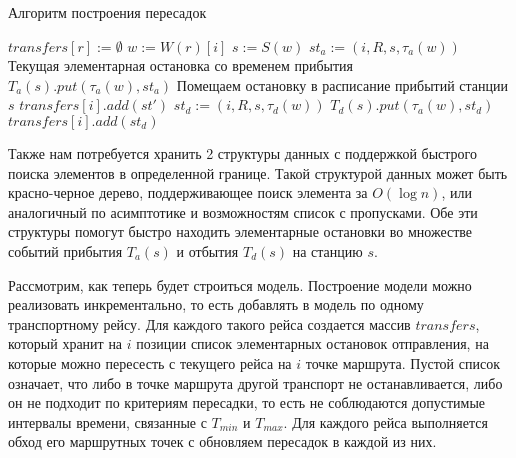 \begin{algorithm}[!h]
	\caption{Алгоритм построения пересадок}\label{lst4}
	\begin{algorithmic}
		\State $transfers[r] := \emptyset$ 
			\State $w := W(r)[i]$
			\State $s := S(w)$ 
			 
				\State $st_a := (i, R, s, \tau_a(w))$ {Текущая элементарная остановка со временем прибытия}
				\State $T_a(s).put(\tau_a(w), st_a)$ {Помещаем остановку в расписание прибытий станции $s$}
					 
						\State $transfers[i].add(st')$
					\EndIf
				\EndFor
			\EndIf
			 
				\State $st_d := (i, R, s, \tau_d(w))$
				\State $T_d(s).put(\tau_a(w), st_d)$
					 
						\State $transfers[i].add(st_d)$
					\EndIf
				\EndFor
			\EndIf
		\EndFor
		\EndFor
		\EndFunction
	\end{algorithmic}
\end{algorithm}

Также нам потребуется хранить 2 структуры данных с поддержкой быстрого поиска элементов в определенной границе. Такой структурой данных может быть красно-черное дерево, поддерживающее поиск элемента за $O(\log n)$, или аналогичный по асимптотике и возможностям список с пропусками. Обе эти структуры помогут быстро находить элементарные остановки во множестве событий прибытия $T_a(s)$ и отбытия $T_d(s)$ на станцию $s$.

Рассмотрим, как теперь будет строиться модель. Построение модели можно реализовать инкрементально, то есть добавлять в модель по одному транспортному рейсу. Для каждого такого рейса создается массив $transfers$, который хранит на $i$ позиции список элементарных остановок отправления, на которые можно пересесть с текущего рейса на $i$ точке маршрута. Пустой список означает, что либо в точке маршрута другой транспорт не останавливается, либо он не подходит по критериям пересадки, то есть не соблюдаются допустимые интервалы времени, связанные с $T_{min}$ и $T_{max}$. Для каждого рейса выполняется обход его маршрутных точек с обновляем пересадок в каждой из них.
\FloatBarrier 

